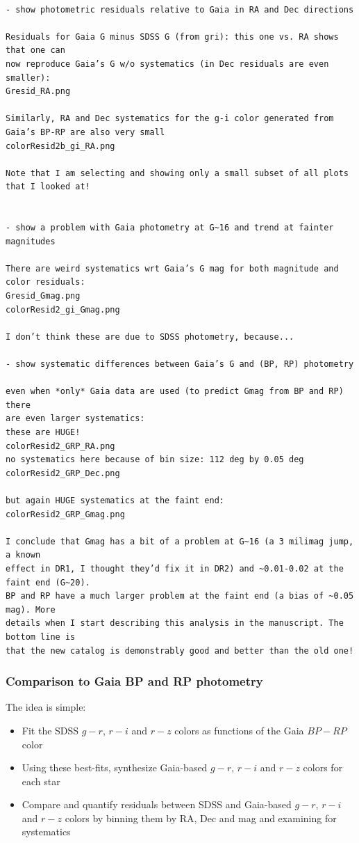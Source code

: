\begin{verbatim}

- show photometric residuals relative to Gaia in RA and Dec directions  

Residuals for Gaia G minus SDSS G (from gri): this one vs. RA shows that one can 
now reproduce Gaia’s G w/o systematics (in Dec residuals are even smaller):
Gresid_RA.png 

Similarly, RA and Dec systematics for the g-i color generated from 
Gaia’s BP-RP are also very small 
colorResid2b_gi_RA.png

Note that I am selecting and showing only a small subset of all plots 
that I looked at! 


- show a problem with Gaia photometry at G~16 and trend at fainter magnitudes

There are weird systematics wrt Gaia’s G mag for both magnitude and
color residuals: 
Gresid_Gmag.png
colorResid2_gi_Gmag.png

I don’t think these are due to SDSS photometry, because...

- show systematic differences between Gaia’s G and (BP, RP) photometry  

even when *only* Gaia data are used (to predict Gmag from BP and RP) there 
are even larger systematics: 
these are HUGE! 
colorResid2_GRP_RA.png
no systematics here because of bin size: 112 deg by 0.05 deg
colorResid2_GRP_Dec.png

but again HUGE systematics at the faint end: 
colorResid2_GRP_Gmag.png

I conclude that Gmag has a bit of a problem at G~16 (a 3 milimag jump, a known
effect in DR1, I thought they’d fix it in DR2) and ~0.01-0.02 at the faint end (G~20). 
BP and RP have a much larger problem at the faint end (a bias of ~0.05 mag). More 
details when I start describing this analysis in the manuscript. The bottom line is 
that the new catalog is demonstrably good and better than the old one! 

\end{verbatim}


\subsubsection{Comparison to Gaia BP and RP photometry} 


The idea is simple: 
\begin{itemize}
\item Fit the SDSS $g-r$, $r-i$ and $r-z$ colors as functions of the Gaia $BP-RP$ color
\item Using these best-fits, synthesize Gaia-based $g-r$, $r-i$ and $r-z$ colors for 
each star
\item Compare and quantify residuals between SDSS and Gaia-based $g-r$, $r-i$ and $r-z$ 
        colors by binning them by RA, Dec and mag and examining for systematics
\end{itemize}

